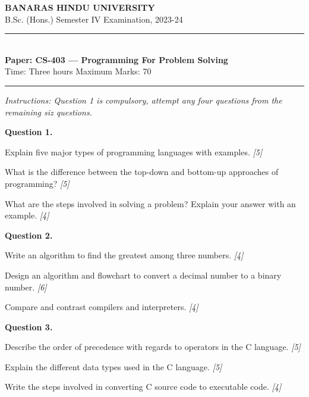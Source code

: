 \documentclass[11pt,a4paper]{article}
\newcommand{\pts}[1]{\hfill   \textit{[#1]}}
\begin{document}
\begin{center}
  {\large\bfseries BANARAS HINDU UNIVERSITY}\\[2pt]
  {
\normalsize B.Sc. (Hons.) Semester IV Examination, 2023-24}\\[6pt]
  \rule{0.8\linewidth}{0.5pt}\\[6pt]
  {\large\bfseries Paper: CS-403 --- Programming For Problem Solving}\\[4pt]
  {
\normalsize Time: Three hours \hfill Maximum Marks: 70}
\end{center}

\rule{\linewidth}{0.4pt}

\smallskip



\noindent   \textit{Instructions: Question 1 is compulsory, attempt any four questions from the remaining siz questions.}

\bigskip

\medskip


\noindent   \textbf{Question 1.}

\begin{parts}
  \item Explain five major types of programming languages with examples. \pts{5}
  \item What is the difference between the top-down and bottom-up approaches of programming? \pts{5}
  \item What are the steps involved in solving a problem? Explain your answer with an example. \pts{4}
\end{parts}

\medskip


\noindent   \textbf{Question 2.}

\begin{parts}
  \item Write an algorithm to find the greatest among three numbers. \pts{4}
  \item Design an algorithm and flowchart to convert a decimal number to a binary number. \pts{6}
  \item Compare and contrast compilers and interpreters. \pts{4}
\end{parts}

\medskip


\noindent   \textbf{Question 3.}

\begin{parts}
  \item Describe the order of precedence with regards to operators in the C language. \pts{5}
  \item Explain the different data types used in the C language. \pts{5}
  \item Write the steps involved in converting C source code to executable code. \pts{4}
\end{parts}
\end{document}
